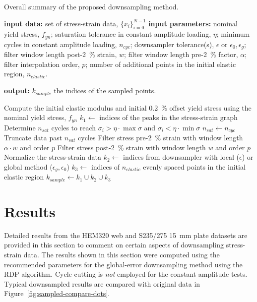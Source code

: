 \documentclass[a4paper,11pt]{article}
\begin{document}
\begin{algorithm}
	\caption{Overall summary of the proposed downsampling method.}
	\label{alg:overall-summary}
	\begin{algorithmic}[1]
        \State \textbf{input data:} set of stress-strain data, $\{x_i\}_{i=0}^{N-1}$
        \State \textbf{input parameters:} nominal yield stress, $f_{yn}$; saturation tolerance in constant amplitude loading, $\eta$; minimum cycles in constant amplitude loading, $n_{cyc}$; downsampler tolerance(s), $\epsilon$ or $\epsilon_0, \epsilon_g$; filter window length post-2~\% strain, $w$; filter window length pre-2~\% factor, $\alpha$; filter interpolation order, $p$; number of additional points in the initial elastic region, $n_{elastic}$.

        \State \textbf{output:} $k_{sample}$ the indices of the sampled points.
        \bigskip

        \State Compute the initial elastic modulus and initial 0.2~\% offset yield stress using the nominal yield stress, $f_{yn}$
        \State $k_{1} \gets $ indices of the peaks in the stress-strain graph
            \State Determine $n_{sat}$ cycles to reach $\sigma_i > \eta \cdot \max \sigma$ and $\sigma_i < \eta \cdot \min \sigma$
                \State $n_{sat} \gets n_{cyc}$
            \EndIf
            \State Truncate data past $n_{sat}$ cycles
        \EndIf
            \State Filter stress pre-2~\% strain with window length $\alpha \cdot w$ and order $p$
            \State Filter stress post-2~\% strain with window length $w$ and order $p$
        \EndIf
        \State Normalize the stress-strain data
        \State $k_2 \gets$ indices from downsampler with local ($\epsilon$) or global method ($\epsilon_g, \epsilon_0$) \label{algline:downsampler}
        \State $k_3 \gets$ indices of $n_{elastic}$ evenly spaced points in the initial elastic region
        \State $k_{sample} \gets k_1 \cup k_2 \cup k_3$
    \end{algorithmic}
\end{algorithm}



\section{Results}

Detailed results from the HEM320 web and S235/275 15~mm plate datasets are provided in this section to comment on certain aspects of downsampling stress-strain data.
The results shown in this section were computed using the recommended parameters for the global-error downsampling method using the RDP algorithm.
Cycle cutting is \emph{not} employed for the constant amplitude tests.
Typical downsampled results are compared with original data in Figure~\ref{fig:sampled-compare-dots}.
\end{document}
